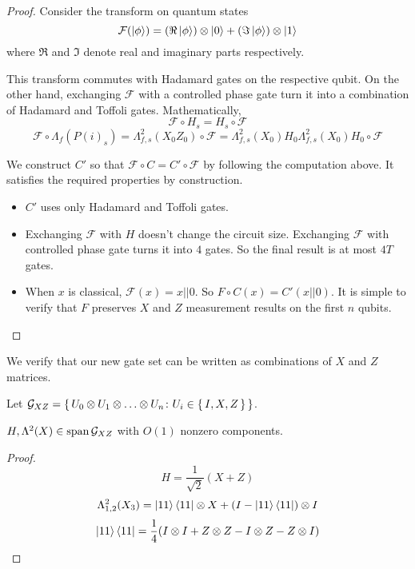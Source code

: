 \begin{proof}

Consider the transform on quantum states
	$$\mathcal{F}(\ket{\phi})=(\Re\ket{\phi})\otimes\ket{0}+(\Im\ket{\phi})\otimes\ket{1}$$
where $\Re$ and $\Im$ denote real and imaginary parts respectively.

This transform commutes with Hadamard gates on the respective qubit. On the other hand, exchanging $\mathcal{F}$ with a controlled phase gate turn it into a combination of Hadamard and Toffoli gates. Mathematically,
$$\mathcal{F}\circ H_s=H_s\circ\mathcal{F}$$
$$\mathcal{F}\circ\Lambda_f(P(i)_s)=\Lambda^2_{f,s}(X_0Z_0)\circ\mathcal{F}=\Lambda^2_{f,s}(X_0)H_0\Lambda^2_{f,s}(X_0)H_0\circ\mathcal{F}$$

We construct $C'$ so that $\mathcal{F}\circ C=C'\circ\mathcal{F}$ by following the computation above. It satisfies the required properties by construction.
\begin{itemize}
	\item $C'$ uses only Hadamard and Toffoli gates.
	\item Exchanging $\mathcal{F}$ with $H$ doesn't change the circuit size. Exchanging $\mathcal{F}$ with controlled phase gate turns it into $4$ gates. So the final result is at most $4T$ gates.
	\item When $x$ is classical, $\mathcal{F}(x)=x||0$. So $F\circ C(x)=C'(x||0)$. It is simple to verify that $F$ preserves $X$ and $Z$ measurement results on the first $n$ qubits.
\end{itemize}
\end{proof}

We verify that our new gate set can be written as combinations of $X$ and $Z$ matrices.

\begin{definition}
	Let $\mathcal{G}_{XZ}=\set{U_0\otimes U_1\otimes\ldots\otimes U_n\colon U_i\in\set{I,X,Z}}$.
\end{definition}

\begin{theorem}
	$H,\Lambda^2(X)\in\operatorname*{\operatorname{span}}\mathcal{G}_{XZ}$ with $O(1)$ nonzero components.
\end{theorem}

\begin{proof}
	$$H=\frac{1}{\sqrt{2}}(X+Z)$$
	$$\Lambda^2_{1,2}(X_3)=\ket{11}\bra{11}\otimes X+(I-\ket{11}\bra{11})\otimes I$$
	$$\ket{11}\bra{11}=\frac{1}{4}(I\otimes I+Z\otimes Z-I\otimes Z-Z\otimes I)$$
\end{proof}

